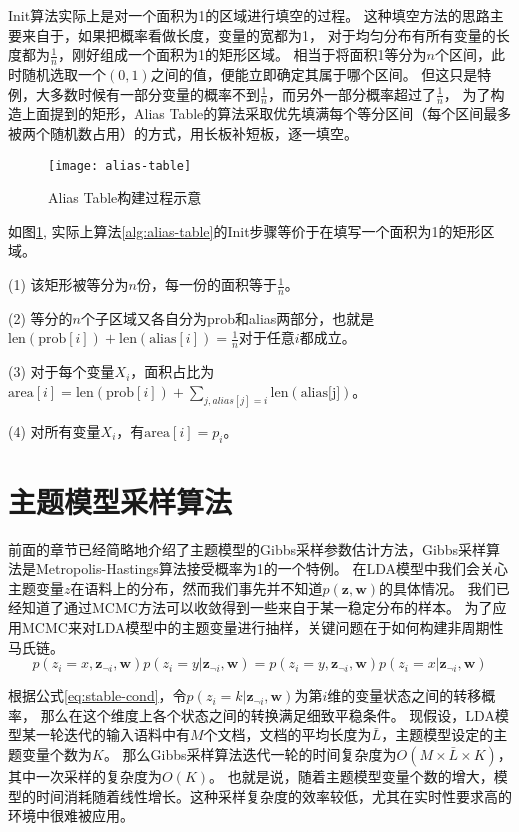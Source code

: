 Init算法实际上是对一个面积为1的区域进行填空的过程。
这种填空方法的思路主要来自于，如果把概率看做长度，变量的宽都为1，
对于均匀分布有所有变量的长度都为$\frac{1}{n}$，刚好组成一个面积为1的矩形区域。
相当于将面积1等分为$n$个区间，此时随机选取一个$(0, 1)$之间的值，便能立即确定其属于哪个区间。
但这只是特例，大多数时候有一部分变量的概率不到$\frac{1}{n}$，而另外一部分概率超过了$\frac{1}{n}$，
为了构造上面提到的矩形，Alias Table的算法采取优先填满每个等分区间（每个区间最多被两个随机数占用）的方式，用长板补短板，逐一填空。

\begin{figure}[htb]\centering
\texttt{[image: alias-table]}
\caption{Alias Table构建过程示意}
\label{fig:alias-table}       %
\end{figure}

如图\ref{fig:alias-table}, 实际上算法\ref{alg:alias-table}的Init步骤等价于在填写一个面积为1的矩形区域。

(1) 该矩形被等分为$n$份，每一份的面积等于$\frac{1}{n}$。

(2) 等分的$n$个子区域又各自分为prob和alias两部分，也就是$\mbox{len}(\mbox{prob}[i]) +\mbox{len}( \mbox{alias}[i]) = \frac{1}{n}$对于任意$i$都成立。

(3) 对于每个变量$X_i$，面积占比为$\mbox{area}[i] = \mbox{len}(\mbox{prob}[i]) + \sum_{j, alias[j]=i}{\mbox{len}(\mbox{alias[j]})}$。

(4) 对所有变量$X_i$，有$\mbox{area}[i] = p_i$。

\section{主题模型采样算法}
前面的章节已经简略地介绍了主题模型的Gibbs采样参数估计方法，Gibbs采样算法是Metropolis-Hastings算法接受概率为1的一个特例。
在LDA模型中我们会关心主题变量$z$在语料上的分布，然而我们事先并不知道$p\mathbf{ (z, w)}$的具体情况。
我们已经知道了通过MCMC方法可以收敛得到一些来自于某一稳定分布的样本。
为了应用MCMC来对LDA模型中的主题变量进行抽样，关键问题在于如何构建非周期性马氏链。
\begin{equation}
\label{eq:stable-cond}
p(z_i = x , \mathbf{z}_{\neg i}, \mathbf{w}) p( z_i = y | \mathbf{z}_{\neg i},  \mathbf{w})  =  
p(z_i = y , \mathbf{z}_{\neg i}, \mathbf{w}) p( z_i = x | \mathbf{z}_{\neg i},  \mathbf{w}) 
\end{equation}

根据公式\ref{eq:stable-cond}，令$p( z_i = k | \mathbf{z}_{\neg i},  \mathbf{w})$为第$i$维的变量状态之间的转移概率，
那么在这个维度上各个状态之间的转换满足细致平稳条件。
现假设，LDA模型某一轮迭代的输入语料中有$M$个文档，文档的平均长度为$\bar{L}$，主题模型设定的主题变量个数为$K$。
那么Gibbs采样算法迭代一轮的时间复杂度为$O(M\times \bar{L} \times K)$，其中一次采样的复杂度为$O(K)$。
也就是说，随着主题模型变量个数的增大，模型的时间消耗随着线性增长。这种采样复杂度的效率较低，尤其在实时性要求高的环境中很难被应用。


